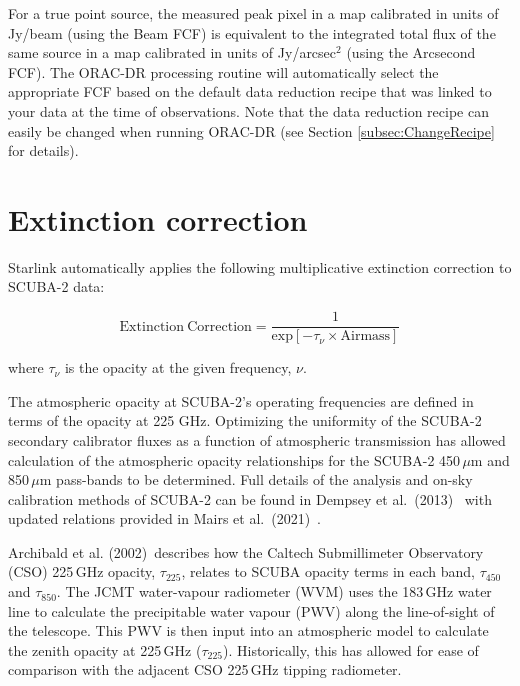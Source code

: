 For a true point source, the measured peak pixel in a map calibrated in units of Jy/beam 
(using the Beam FCF) is equivalent to the integrated total flux of the same source in a map 
calibrated in units of Jy/arcsec$^{2}$ (using the Arcsecond FCF). The ORAC-DR processing 
routine will automatically select the appropriate FCF based on the default data reduction recipe 
that was linked to your data at the time of observations. Note that the data reduction recipe can 
easily be changed when running ORAC-DR (see Section \ref{subsec:ChangeRecipe} for details).

\section{Extinction correction}

Starlink automatically applies the following multiplicative extinction correction to SCUBA-2 data:

\begin{equation}
\label{eq:extcor}
\mathrm{Extinction\:Correction} = \frac{1}{\mathrm{exp}[-\tau_{\nu}\times\mathrm{Airmass}]}
\end{equation}

where $\tau_{\nu}$ is the opacity at the given frequency, $\nu$.

The atmospheric opacity at SCUBA-2’s operating frequencies are defined in 
terms of the opacity at 225 GHz. Optimizing the uniformity of the SCUBA-2 secondary 
calibrator fluxes as a function of atmospheric transmission has allowed calculation
of the atmospheric opacity relationships for the SCUBA-2 450\,$\mu$m and
850\,$\mu$m pass-bands to be determined. Full details of the analysis
and on-sky calibration methods of SCUBA-2 can be found in Dempsey et
al.\ (2013)~\cite{dempsey12}\cite{dempsey-spie} with
updated relations provided in Mairs et al.\ (2021)~\cite{mairs21}.

Archibald et al. (2002)\,\cite{archibald} describes how the Caltech
Submillimeter Observatory (CSO) 225\,GHz opacity, $\tau_{225}$,
relates to SCUBA opacity terms in each band, $\tau_{450}$ and
$\tau_{850}$. The JCMT water-vapour radiometer (WVM) uses the 183\,GHz
water line to calculate the precipitable water vapour (PWV) along the
line-of-sight of the telescope. This PWV is then input into an
atmospheric model to calculate the zenith opacity at 225\,GHz
($\tau_{225}$). Historically, this has allowed for ease of 
comparison with the adjacent CSO 225\,GHz tipping radiometer. 

